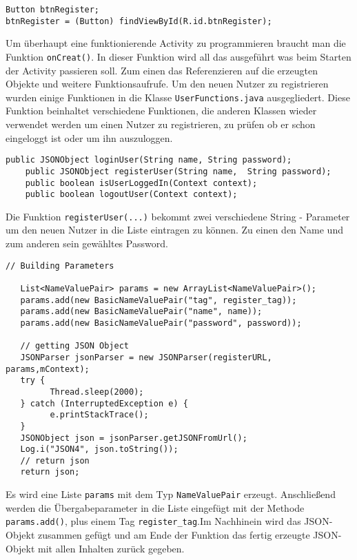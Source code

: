 \begin{lstlisting}[caption={Objekt Erzeugung und Referenzierung},captionpos=b]
Button btnRegister;
btnRegister = (Button) findViewById(R.id.btnRegister);
\end{lstlisting}
Um überhaupt eine funktionierende Activity zu programmieren braucht man die Funktion \texttt{onCreat()}. In dieser Funktion wird all das ausgeführt was beim 
Starten der Activity passieren soll. Zum einen das Referenzieren auf die erzeugten Objekte und weitere Funktionsaufrufe.
Um den neuen Nutzer zu registrieren wurden einige Funktionen in die Klasse \texttt{UserFunctions.java} ausgegliedert. Diese Funktion beinhaltet verschiedene Funktionen, die anderen Klassen wieder verwendet werden um einen Nutzer zu registrieren, zu prüfen ob er schon eingeloggt ist oder um ihn auszuloggen.
\begin{lstlisting}[caption={User Functions},captionpos=b]
    public JSONObject loginUser(String name, String password);
    public JSONObject registerUser(String name,  String password);
    public boolean isUserLoggedIn(Context context);
    public boolean logoutUser(Context context);
\end{lstlisting}
Die Funktion \texttt{registerUser(...)} bekommt zwei verschiedene String - Parameter um den neuen Nutzer in die Liste eintragen zu können. Zu einen den Name und zum anderen sein gewähltes Password.
\begin{lstlisting}[caption={registerUser(...)},captionpos=b]
// Building Parameters

   List<NameValuePair> params = new ArrayList<NameValuePair>();
   params.add(new BasicNameValuePair("tag", register_tag));
   params.add(new BasicNameValuePair("name", name));
   params.add(new BasicNameValuePair("password", password));

   // getting JSON Object
   JSONParser jsonParser = new JSONParser(registerURL, params,mContext);
   try {
         Thread.sleep(2000);
   } catch (InterruptedException e) {
         e.printStackTrace();
   }
   JSONObject json = jsonParser.getJSONFromUrl();
   Log.i("JSON4", json.toString());
   // return json
   return json;
\end{lstlisting}
Es wird eine Liste \texttt{params} mit dem Typ \texttt{NameValuePair} erzeugt. Anschließend werden die Übergabeparameter in die Liste eingefügt mit der Methode \texttt{params.add()}, plus einem Tag \texttt{register\_tag}.Im Nachhinein wird das JSON-Objekt zusammen gefügt und am Ende der Funktion das fertig erzeugte JSON-Objekt mit allen Inhalten zurück gegeben.
